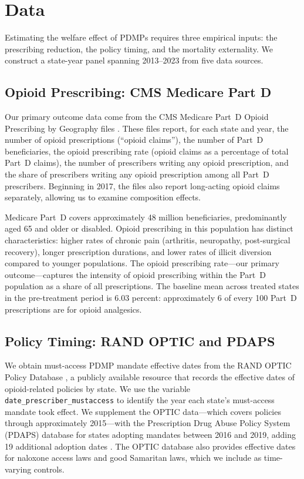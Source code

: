 \documentclass[12pt]{article}
\begin{document}
\section{Data}\label{sec:data}

Estimating the welfare effect of PDMPs requires three empirical inputs: the prescribing reduction, the policy timing, and the mortality externality. We construct a state-year panel spanning 2013--2023 from five data sources.

\subsection{Opioid Prescribing: CMS Medicare Part D}\label{sec:data_cms}

Our primary outcome data come from the CMS Medicare Part~D Opioid Prescribing by Geography files \citep{cms2023partd}. These files report, for each state and year, the number of opioid prescriptions (``opioid claims''), the number of Part~D beneficiaries, the opioid prescribing rate (opioid claims as a percentage of total Part~D claims), the number of prescribers writing any opioid prescription, and the share of prescribers writing any opioid prescription among all Part~D prescribers. Beginning in 2017, the files also report long-acting opioid claims separately, allowing us to examine composition effects.

Medicare Part~D covers approximately 48 million beneficiaries, predominantly aged 65 and older or disabled. Opioid prescribing in this population has distinct characteristics: higher rates of chronic pain (arthritis, neuropathy, post-surgical recovery), longer prescription durations, and lower rates of illicit diversion compared to younger populations. The opioid prescribing rate---our primary outcome---captures the intensity of opioid prescribing within the Part~D population as a share of all prescriptions. The baseline mean across treated states in the pre-treatment period is 6.03 percent: approximately 6 of every 100 Part~D prescriptions are for opioid analgesics.

\subsection{Policy Timing: RAND OPTIC and PDAPS}\label{sec:data_optic}

We obtain must-access PDMP mandate effective dates from the RAND OPTIC Policy Database \citep{griffin2020pdmp}, a publicly available resource that records the effective dates of opioid-related policies by state. We use the variable \texttt{date\_prescriber\_mustaccess} to identify the year each state's must-access mandate took effect. We supplement the OPTIC data---which covers policies through approximately 2015---with the Prescription Drug Abuse Policy System (PDAPS) database for states adopting mandates between 2016 and 2019, adding 19 additional adoption dates \citep{schiller2022prescription}. The OPTIC database also provides effective dates for naloxone access laws and good Samaritan laws, which we include as time-varying controls.
\end{document}
